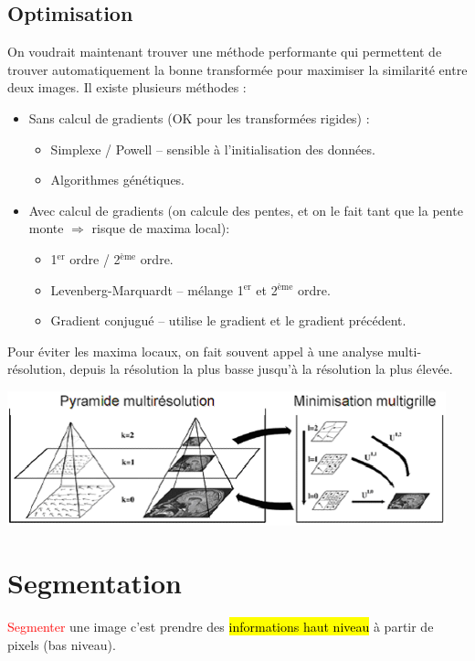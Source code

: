 \documentclass[letterpaper, 12pt]{article}
\newcommand{\alinea}{
\hspace*{0.5cm}}
\newcommand{\red}[1]{
	\textcolor{red}{#1}}
\begin{document}
	\subsection{Optimisation}
		\alinea On voudrait maintenant trouver une méthode performante qui permettent de trouver automatiquement
			la bonne transformée pour maximiser la similarité entre deux images. Il existe plusieurs méthodes : 
			\begin{itemize}
				\setlength\itemsep{0cm}
				\item Sans calcul de gradients (OK pour les transformées rigides) :
				\begin{itemize}
					\setlength\itemsep{0cm}
					\item Simplexe / Powell -- sensible à l'initialisation des données.
					\item Algorithmes génétiques.
				\end{itemize}
				\item Avec calcul de gradients (on calcule des pentes, et on le fait tant que la pente monte $\Rightarrow$ 
					risque de maxima local):
				\begin{itemize}
					\setlength\itemsep{0cm}
					\item 1$^{\text{er}}$ ordre / 2$^{\text{ème}}$ ordre.
					\item Levenberg-Marquardt -- mélange 1$^{\text{er}}$  et 2$^{\text{ème}}$ ordre.
					\item Gradient conjugué -- utilise le gradient et le gradient précédent.
				\end{itemize}
			\end{itemize}
		\alinea Pour éviter les maxima locaux, on fait souvent appel à une analyse multi-résolution, depuis la résolution
			la plus basse jusqu'à la résolution la plus élevée.
			\begin{center}
				\includegraphics[width=5in]{Images/multi-resolution}
			\end{center}
%
\section{Segmentation}
	\alinea \red{Segmenter} une image c'est prendre des \hl{informations haut niveau} à partir de pixels (bas niveau).
\end{document}
